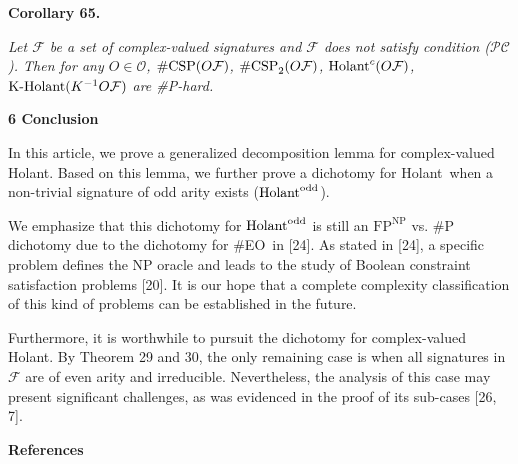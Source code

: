 

\par\medskip\noindent\textbf{
\textbf{Corollary 65}\textbf{.}
}\par



\emph{Let $\mathcal{F}$ be a set of complex-valued signatures and $\mathcal{F}$ does not satisfy condition ($\mathcal{PC}$). Then for any $O\in\mathscr{O}$, $\textup{{\#CSP}}(O\mathcal{F})$, $\textup{{\#CSP}}_{2}(O\mathcal{F})$, $\textup{{Holant}}^{c}(O\mathcal{F})$, $\textup{{K-Holant}}(K^{-1}O\mathcal{F})$ are \#P-hard.}\par








\par\medskip\noindent\textbf{
6 Conclusion}\par




In this article, we prove a generalized decomposition lemma for complex-valued Holant. Based on this lemma, we further prove a dichotomy for Holant when a non-trivial signature of odd arity exists ($\textup{{Holant}}^{\text{odd}}$).\par




We emphasize that this dichotomy for $\textup{{Holant}}^{\text{odd}}$ is still an $\text{FP}^{\text{NP}}$ vs. \#P dichotomy due to the dichotomy for \#EO in [24]. As stated in [24], a specific problem defines the NP oracle and leads to the study of Boolean constraint satisfaction problems [20]. It is our hope that a complete complexity classification of this kind of problems can be established in the future.\par




Furthermore, it is worthwhile to pursuit the dichotomy for complex-valued Holant. By Theorem 29 and 30, the only remaining case is when all signatures in $\mathcal{F}$ are of even arity and irreducible. Nevertheless, the analysis of this case may present significant challenges, as was evidenced in the proof of its sub-cases [26, 7].\par





\par\medskip\noindent\textbf{References}\par



